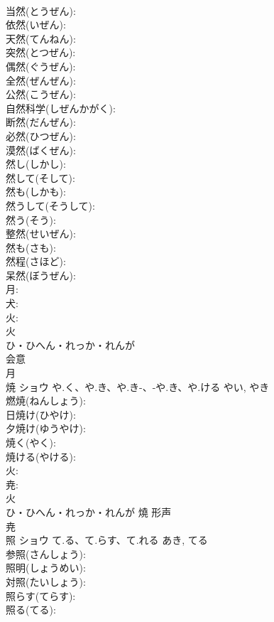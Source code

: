 \documentclass[8pt]{extreport}
\begin{document}
\begin{CJK}{UTF8}{min}
\\	当然(とうぜん): 
\\	依然(いぜん): 
\\	天然(てんねん): 
\\	突然(とつぜん): 
\\	偶然(ぐうぜん): 
\\	全然(ぜんぜん): 
\\	公然(こうぜん): 
\\	自然科学(しぜんかがく): 
\\	断然(だんぜん): 
\\	必然(ひつぜん): 
\\	漠然(ばくぜん): 
\\	然し(しかし): 
\\	然して(そして): 
\\	然も(しかも): 
\\	然うして(そうして): 
\\	然う(そう): 
\\	整然(せいぜん): 
\\	然も(さも): 
\\	然程(さほど): 
\\	呆然(ぼうぜん): 
\\	月: 
\\	犬: 
\\	火: 
\\	火	
\\	ひ・ひへん・れっか・れんが	
\\	会意 
\\	月 
\\	焼	ショウ	や.く、や.き、や.き-、-や.き、や.ける	やい, やき	
\\	燃焼(ねんしょう): 
\\	日焼け(ひやけ): 
\\	夕焼け(ゆうやけ): 
\\	焼く(やく): 
\\	焼ける(やける): 
\\	火: 
\\	尭: 
\\	火	
\\	ひ・ひへん・れっか・れんが	燒	形声 
\\	尭 
\\	照	ショウ	て.る、て.らす、て.れる	あき, てる	
\\	参照(さんしょう): 
\\	照明(しょうめい): 
\\	対照(たいしょう): 
\\	照らす(てらす): 
\\	照る(てる): 

\end{CJK}
\end{document}
